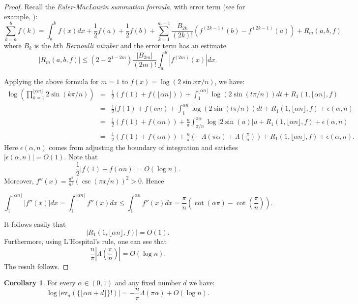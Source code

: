 \documentclass{amsart}
\theoremstyle{definition}
\newtheorem{corollary}[theorem]{Corollary}
\def\a{\alpha}
\def\La{\Lambda}
\def\e{\epsilon}
\def\al{\alpha}
\def\ev{\mathrm{ev}}
\begin{document}
\begin{proof}
Recall the {\em Euler-MacLaurin summation formula},
with error term (see for example, \cite[Chpt. 8]{O}):
$$
\sum_{k=a}^b f(k)=\int_a^b f(x) dx + \frac{1}{2} f(a) +
\frac{1}{2} f(b) +
\sum_{k=1}^{m-1} \frac{B_{2k}}{(2k)!}( f^{(2k-1)}(b)-f^{(2k-1)}(a) )
+ R_m(a,b,f)
$$
where $B_k$ is the $k$th {\em Bernoulli number} and the error term has an
estimate
$$
|R_m(a,b,f)| \leq (2-2^{1-2m}) \frac{|B_{2m}|}{(2m)!}
\int_a^b |f^{(2m)}(x)| dx.
$$

Applying the above formula  for $m=1$ to $f(x)=\log(2 \sin
x\pi/n)$, we have:
\begin{eqnarray*}
\log(\prod_{k=1}^{\lfloor \a n \rfloor } 2\sin (k \pi/n)) & = &
\frac{1}{2} (f(1)+f(\lfloor \a n \rfloor ))+
\int_1^{\lfloor \a n \rfloor } \log(2\sin (t \pi/n)) dt
+R_1(1,\lfloor \a n \rfloor,f) \\
& = &  \frac{1}{2} (f(1)+f( \a n )+
\int_1^{\a n } \log(2\sin (t \pi/n)) dt
+R_1(1,\lfloor \a n \rfloor,f) + \e(\a,n) \\
& = & \frac{1}{2} (f(1)+f(\a n))+ \frac{n}{\pi}  \int_{\pi/n}^{\pi
\a} \log|2 \sin (  u)| u +R_1(1,\lfloor \a n \rfloor, f) +\e(\a,n)
\\
& = & \frac{1}{2} (f(1)+f(\a n))+ \frac{n}{\pi} \left(-\La(\pi \a) +
\La(\frac{\pi}{n}) \right) + R_1(1,\lfloor \a n \rfloor, f) +
\e(\a,n).
\end{eqnarray*}
Here $\e(\a,n)$ comes from adjusting the boundary of integration and
satisfies $|\e(\a,n) | = O(1)$. Note that
$$
\frac{1}{2} |f(1)+f(\a n)| = O( \log n).
$$
Moreover,
$f''(x)=\frac{\pi^2}{n^2} (\csc(\pi x/n))^2 >0$. Hence

$$
\int_1^{\lfloor \al n\rfloor} |f''(x)| dx
=\int_1^{\lfloor \al n\rfloor} f''(x) dx \le \int_1^{\al n} f''(x) dx
= \frac{\pi}{n} \left( \cot(\al \pi) - \cot\left(\frac{\pi}{n}\right)\right).
$$

It follows easily that
$$
|R_1(1,\lfloor \a n \rfloor, f)| = O(1).
$$
Furthermore, using L'Hospital's rule,
one can see  that
$$
\frac{n}{\pi} \left|\La(\frac{\pi}{n})\right| = O( \log n).
$$
The result follows.
\end{proof}


\begin{corollary} For every $\a \in (0,1)$  and any fixed number $d$ we have:
$$
\log\left|\ev_n (\{ \lfloor \a n  +d \rfloor \}!)\right|=
-\frac{n}{\pi} \La(\pi \a) +O(\log n).
$$
\label{87}
\end{corollary}
\end{document}
